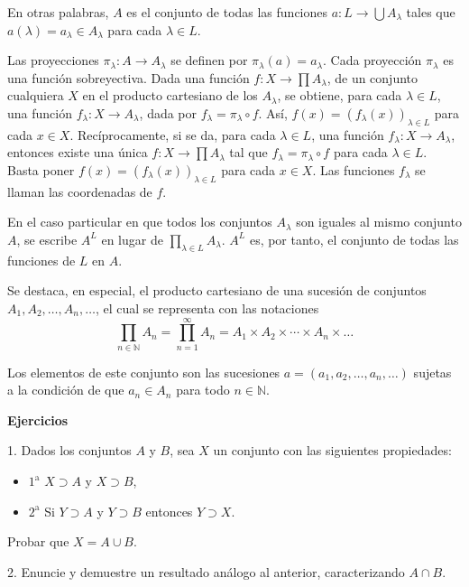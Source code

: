\documentclass[12pt,oneside]{book}
\begin{document}
En otras palabras, \(A\) es el conjunto de todas las funciones \(a: L \to \bigcup A_\lambda\) tales que \(a(\lambda) = a_\lambda \in A_\lambda\) para cada \(\lambda \in L\).

Las proyecciones \(\pi_\lambda: A \to A_\lambda\) se definen por \(\pi_\lambda(a) = a_\lambda\). Cada proyección \(\pi_\lambda\) es una función sobreyectiva. Dada una función \(f: X \to \prod A_\lambda\), de un conjunto cualquiera \(X\) en el producto cartesiano de los \(A_\lambda\), se obtiene, para cada \(\lambda \in L\), una función \(f_\lambda: X \to A_\lambda\), dada por \(f_\lambda = \pi_\lambda \circ f\). Así, \(f(x) = (f_\lambda(x))_{\lambda \in L}\) para cada \(x \in X\). Recíprocamente, si se da, para cada \(\lambda \in L\), una función \(f_\lambda: X \to A_\lambda\), entonces existe una única \(f: X \to \prod A_\lambda\) tal que \(f_\lambda = \pi_\lambda \circ f\) para cada \(\lambda \in L\). Basta poner \(f(x) = (f_\lambda(x))_{\lambda \in L}\) para cada \(x \in X\). Las funciones \(f_\lambda\) se llaman las coordenadas de \(f\).

En el caso particular en que todos los conjuntos \(A_\lambda\) son iguales al mismo conjunto \(A\), se escribe \(A^L\) en lugar de \(\prod_{\lambda \in L} A_\lambda\). \(A^L\) es, por tanto, el conjunto de todas las funciones de \(L\) en \(A\).

Se destaca, en especial, el producto cartesiano de una sucesión de conjuntos \(A_1, A_2, \dots, A_n, \dots\), el cual se representa con las notaciones
\[
\prod_{n \in \mathbb{N}} A_n = \prod_{n=1}^{\infty} A_n = A_1 \times A_2 \times \cdots \times A_n \times \dots
\]

Los elementos de este conjunto son las sucesiones \(a = (a_1, a_2, \dots, a_n, \dots)\) sujetas a la condición de que \(a_n \in A_n\) para todo \(n \in \mathbb{N}\).

\textbf{Ejercicios}

1. Dados los conjuntos \(A\) y \(B\), sea \(X\) un conjunto con las siguientes propiedades:

\begin{itemize}
\item[] \(1^\text{a}\) \(X \supset A\) y \(X \supset B\),
\item[] \(2^\text{a}\) Si \(Y \supset A\) y \(Y \supset B\) entonces \(Y \supset X\).
\end{itemize}

Probar que \(X = A \cup B\).

2. Enuncie y demuestre un resultado análogo al anterior, caracterizando \( A \cap B \).
\end{document}

